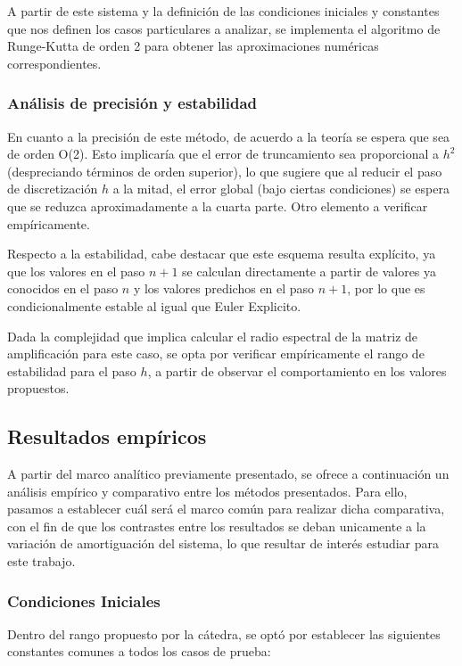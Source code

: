 \documentclass[titlepage,a4paper]{article}
\begin{document}
A partir de este sistema y la definición de las condiciones iniciales y constantes que nos definen los casos particulares a analizar, se implementa el algoritmo de Runge-Kutta de orden 2 para obtener las aproximaciones numéricas correspondientes.

\subsubsection{Análisis de precisión y estabilidad}

En cuanto a la precisión de este método, de acuerdo a la teoría se espera que sea de orden O(2). Esto implicaría que el error de truncamiento sea proporcional a $h^2$ (despreciando términos de orden superior), lo que sugiere que al reducir el paso de discretización $h$ a la mitad, el error global (bajo ciertas condiciones) se espera que se reduzca aproximadamente a la cuarta parte. Otro elemento a verificar empíricamente.

Respecto a la estabilidad, cabe destacar que este esquema resulta explícito, ya que los valores en el paso $n+1$ se calculan directamente a partir de valores ya conocidos en el paso $n$ y los valores predichos en el paso $n+1$, por lo que es condicionalmente estable al igual que Euler Explicito.

Dada la complejidad que implica calcular el radio espectral de la matriz de amplificación para este caso, se opta por verificar empíricamente el rango de estabilidad para el paso $h$, a partir de observar el comportamiento en los valores propuestos. 

\subsection{Resultados empíricos}

A partir del marco analítico previamente presentado, se ofrece a continuación un análisis empírico y comparativo entre los métodos presentados. Para ello, pasamos a establecer cuál será el marco común para realizar dicha comparativa, con el fin de que los contrastes entre los resultados se deban unicamente a la variación de amortiguación del sistema, lo que resultar de interés estudiar para este trabajo.

\subsubsection{Condiciones Iniciales}

Dentro del rango propuesto por la cátedra, se optó por establecer las siguientes constantes comunes a todos los casos de prueba:
\end{document}
